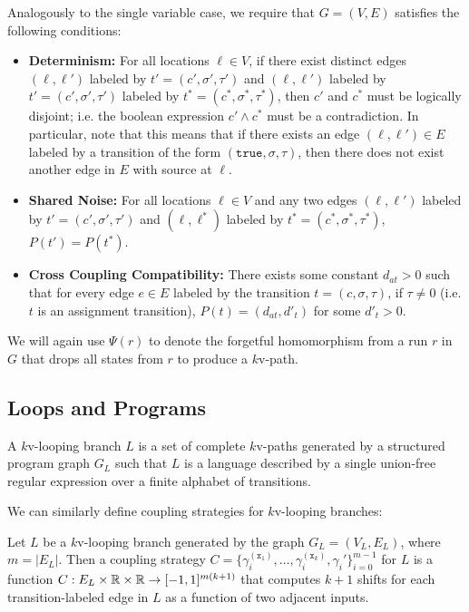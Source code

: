 Analogously to the single variable case, we require that $G = (V, E)$ satisfies the following conditions: 
\begin{itemize}
    \item \textbf{Determinism:} For all locations $\ell\in V$, if there exist distinct edges $(\ell, \ell')$ labeled by $t'=(c', \sigma', \tau')$ and $(\ell, \ell')$ labeled by $t'=(c', \sigma', \tau')$ labeled by $t^* = (c^*, \sigma^*, \tau^*)$, then $c'$ and $c^*$ must be logically disjoint; i.e. the boolean expression $c' \land c^*$ must be a contradiction. 
    In particular, note that this means that if there exists an edge $(\ell, \ell')\in E$ labeled by a transition of the form $(\texttt{true}, \sigma, \tau)$, then there does not exist another edge in $E$ with source at $\ell$.
    \item \textbf{Shared Noise:} For all locations $\ell\in V$ and any two edges $(\ell, \ell')$ labeled by $t'=(c', \sigma', \tau')$ and $(\ell, \ell^*)$ labeled by $t^* = (c^*, \sigma^*, \tau^*)$, $P(t') = P(t^*)$. 
    \item \textbf{Cross Coupling Compatibility:} There exists some constant $d_{at}>0$ such that for every edge $e\in E$ labeled by the transition $t = (c, \sigma, \tau)$, if $\tau \neq 0$ (i.e. $t$ is an assignment transition), $P(t) = (d_{at}, d'_t)$ for some $d'_t >0$.
\end{itemize}

We will again use $\Psi(r)$ to denote the forgetful homomorphism from a run $r$ in $G$ that drops all states from $r$ to produce a $k$v-path. 

\subsection{Loops and Programs}

\begin{defn}
    A $k$v-looping branch $L$ is a set of complete $k$v-paths generated by a structured program graph $G_L$ such that $L$ is a language described by a single union-free regular expression over a finite alphabet of transitions. 
\end{defn}

We can similarly define coupling strategies for $k$v-looping branches:

\begin{defn}
    Let $L$ be a $k$v-looping branch generated by the graph $G_L = (V_L, E_L)$, where $m = |E_L|$. Then a coupling strategy $C = \{\gamma_i^{(\texttt{x}_1)},\ldots, \gamma_i^{(\texttt{x}_k)}, \gamma_i'\}_{i=0}^{m-1}$ for $L$ is a function $C:E_L\times\mathbb{R} \times\mathbb{R}\to [-1, 1]^{m(k+1)}$ that computes $k+1$ shifts for each transition-labeled edge in $L$ as a function of two adjacent inputs.
\end{defn}


